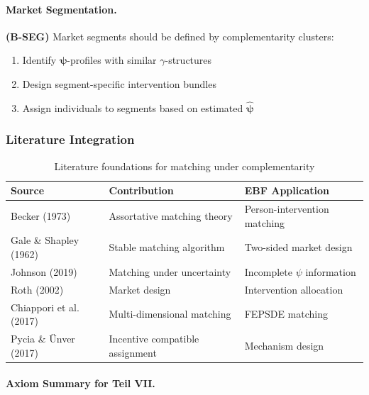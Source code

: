 \paragraph{Market Segmentation.}

\begin{axiom}
\label{ax:B-SEG}
\textbf{(B-SEG)} Market segments should be defined by complementarity clusters:
\begin{enumerate}
    \item Identify $\boldsymbol{\psi}$-profiles with similar $\gamma$-structures
    \item Design segment-specific intervention bundles
    \item Assign individuals to segments based on estimated $\hat{\boldsymbol{\psi}}$
\end{enumerate}
\end{axiom}

\subsubsection{Literature Integration}

\begin{table}[h]
\centering
\small
\begin{tabular}{p{3.5cm}p{4cm}p{5cm}}
\toprule
\textbf{Source} & \textbf{Contribution} & \textbf{EBF Application} \\
\midrule
Becker (1973) & Assortative matching theory & Person-intervention matching \\
Gale \& Shapley (1962) & Stable matching algorithm & Two-sided market design \\
Johnson (2019) & Matching under uncertainty & Incomplete $\psi$ information \\
Roth (2002) & Market design & Intervention allocation \\
Chiappori et al. (2017) & Multi-dimensional matching & FEPSDE matching \\
Pycia \& Ünver (2017) & Incentive compatible assignment & Mechanism design \\
\bottomrule
\end{tabular}
\caption{Literature foundations for matching under complementarity}
\label{tab:matching-lit}
\end{table}

\paragraph{Axiom Summary for Teil VII.}

